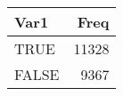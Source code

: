 \begin{table}[H]
\centering
\begin{tabular}[t]{lr}
\toprule
Var1 & Freq\\
\midrule
TRUE & 11328\\
FALSE & 9367\\
\bottomrule
\end{tabular}
\end{table}